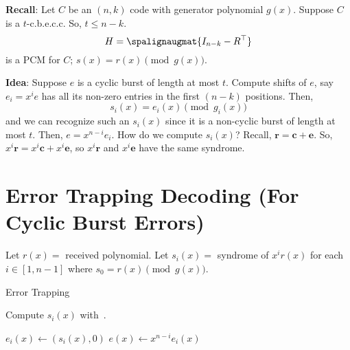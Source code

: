 \textbf{Recall}: Let $ C $ be an $ (n,k) $ code with generator polynomial
$ g(x) $. Suppose $ C $ is a $ t $-c.b.e.c.c. So, $ t\leqslant n-k $.
\[ H=\spalignaugmat{I_{n-k} -R^\top} \]
is a PCM for $ C $; $ s(x)=r(x)\pmod{g(x)} $.

\textbf{Idea}: Suppose $ e $ is a cyclic burst of length at most $ t $.
Compute shifts of $ e $, say $ e_i=x^i e $ has all its non-zero entries in the first
$ (n-k) $ positions. Then,
\[ s_i(x)=e_i(x)\pmod{g_i(x)} \]
and we can recognize such an $ s_i(x) $ since it is a non-cyclic burst of length
at most $ t $. Then, $ e=x^{n-i}e_i $. How do we compute $ s_i(x) $? Recall,
$ \symbf{r}=\symbf{c}+\symbf{e} $. So, $ x^i \symbf{r}=x^i\symbf{c}+x^i\symbf{e} $, so
$ x^i \symbf{r} $ and $ x^i\symbf{e} $ have the same syndrome.

\section{Error Trapping Decoding (For Cyclic Burst Errors)}
Let $ r(x)= $ received polynomial. Let $ s_i(x)= $ syndrome of $ x^i r(x) $ for
each $ i\in[1,n-1] $ where $ s_0=r(x)\pmod{g(x)} $.

\begin{algorithm}
    \DontPrintSemicolon{}
    \caption{Error Trapping}

     {
        Compute $ s_i(x) $ with~.

         {
            $ e_i(x)\gets(s_i(x),0) $\;
            $ e(x)\gets x^{n-i}e_i(x) $\;
        }
    }
    \Return{}
\end{algorithm}

